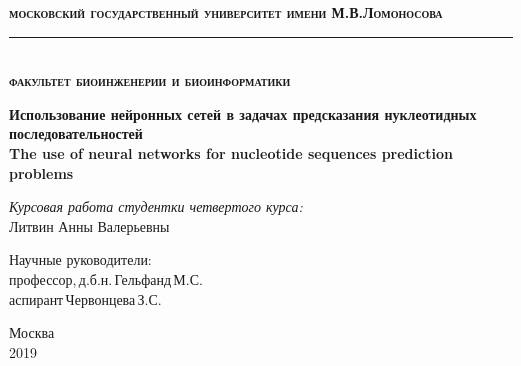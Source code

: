 \begin{titlepage}

\newcommand{\HRule}{\rule{\linewidth}{0.3mm}} %

\center

\textbf{\textsc{\Large московский государственный университет} \textsc{\large имени }\textsc{\Large М.В.Ломоносова}}
\\[0.3cm] 
\HRule 
\\[0.3cm]
\textbf{\textsc{\large факультет биоинженерии и биоинформатики}}
\\[4.0cm]

\begin{spacing}{1.4}
{ \LARGE \bfseries  Использование нейронных сетей в задачах предсказания нуклеотидных последовательностей}  \\[1.0cm] 


{\LARGE \bfseries The use of neural networks for nucleotide sequences prediction problems} \\[2.0cm] \end{spacing} 
 
 
\Large \emph{Курсовая работа студентки четвертого курса:}\\
Литвин Анны Валерьевны
\\[3cm]



\begin{flushright} \large
Научные руководители: \\
профессор,\,д.б.н.\,Гельфанд\,М.С.\\
аспирант\,Червонцева\,З.С.\\
\end{flushright}




\vfill

{\large Москва \\ 2019}
\end{titlepage}

